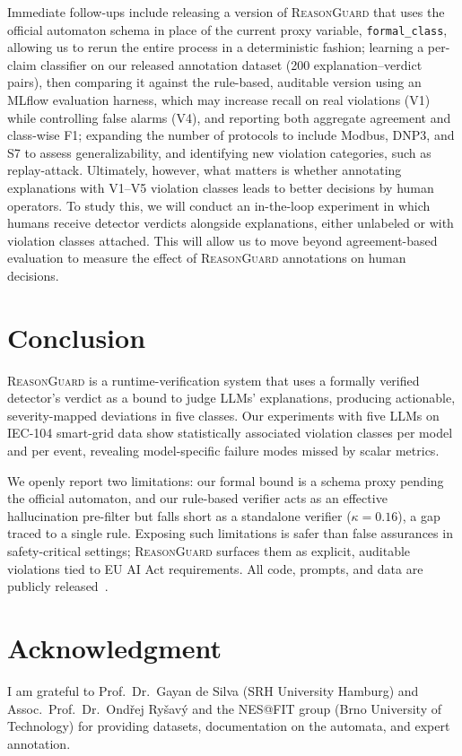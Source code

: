 \documentclass[conference]{IEEEtran}
\newcommand{\rg}{\textsc{ReasonGuard}}
\begin{document}
Immediate follow-ups include releasing a version of \rg{} that uses the official automaton schema in place of the current proxy variable, \texttt{formal\_class}, allowing us to rerun the entire process in a deterministic fashion; learning a per-claim classifier on our released annotation dataset (200 explanation--verdict pairs), then comparing it against the rule-based, auditable version using an MLflow evaluation harness, which may increase recall on real violations (V1) while controlling false alarms (V4), and reporting both aggregate agreement and class-wise F1; expanding the number of protocols to include Modbus, DNP3, and S7 to assess generalizability, and identifying new violation categories, such as replay-attack. Ultimately, however, what matters is whether annotating explanations with V1--V5 violation classes leads to better decisions by human operators. To study this, we will conduct an in-the-loop experiment in which humans receive detector verdicts alongside explanations, either unlabeled or with violation classes attached. This will allow us to move beyond agreement-based evaluation to measure the effect of \rg{} annotations on human decisions.

\section{Conclusion}\label{sec:conclusion}

\rg{} is a runtime-verification system that uses a formally verified detector's verdict as a bound to judge LLMs' explanations, producing actionable, severity-mapped deviations in five classes. Our experiments with five LLMs on IEC-104 smart-grid data show statistically associated violation classes per model and per event, revealing model-specific failure modes missed by scalar metrics.

We openly report two limitations: our formal bound is a schema proxy pending the official automaton, and our rule-based verifier acts as an effective hallucination pre-filter but falls short as a standalone verifier ($\kappa = 0.16$), a gap traced to a single rule. Exposing such limitations is safer than false assurances in safety-critical settings; \rg{} surfaces them as explicit, auditable violations tied to EU AI Act requirements. All code, prompts, and data are publicly released~\cite{ReasonGuardArtifact2026}.

\section*{Acknowledgment}
I am grateful to Prof.\ Dr.\ Gayan de Silva (SRH University Hamburg) and Assoc.\ Prof.\ Dr.\ Ond\v{r}ej Ry\v{s}av\'{y} and the NES@FIT group (Brno University of Technology) for providing datasets, documentation on the automata, and expert annotation.



\end{document}
